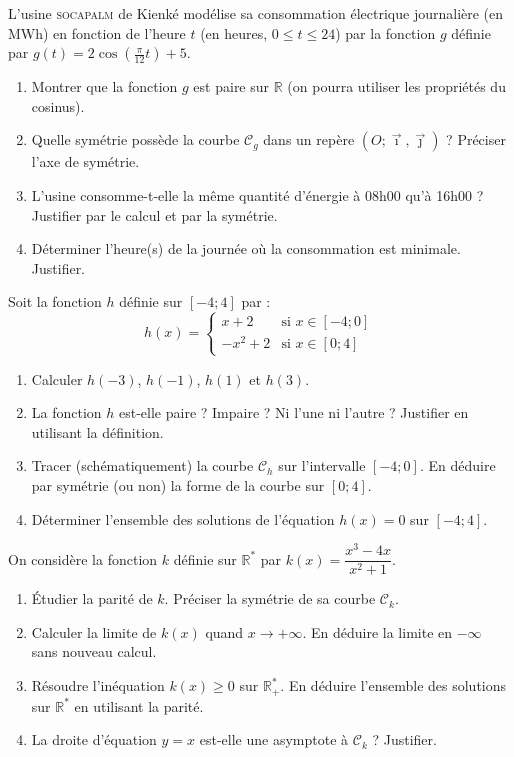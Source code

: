 \documentclass[11pt]{article}
\begin{document}
\begin{exercice}
\label{exo:usine}
L'usine \textsc{socapalm} de Kienké modélise sa consommation électrique journalière (en MWh) en fonction de l'heure $t$ (en heures, $0 \le t \le 24$) par la fonction $g$ définie par $g(t) = 2\cos\left(\frac{\pi}{12}t\right) + 5$.
\begin{enumerate}
    \item Montrer que la fonction $g$ est paire sur $\mathbb{R}$ (on pourra utiliser les propriétés du cosinus).
    \item Quelle symétrie possède la courbe $\mathcal{C}_g$ dans un repère $(O; \vec{\imath}, \vec{\jmath})$ ? Préciser l'axe de symétrie.
    \item L'usine consomme-t-elle la même quantité d'énergie à 08h00 qu'à 16h00 ? Justifier par le calcul et par la symétrie.
    \item Déterminer l'heure(s) de la journée où la consommation est minimale. Justifier.
\end{enumerate}
\end{exercice}

\begin{exercice}
\label{exo:construction}
Soit la fonction $h$ définie sur $[-4; 4]$ par :
\[
h(x) = \begin{cases}
x + 2 & \text{si } x \in [-4; 0] \\
-x^2 + 2 & \text{si } x \in [0; 4]
\end{cases}
\]
\begin{enumerate}
    \item Calculer $h(-3)$, $h(-1)$, $h(1)$ et $h(3)$.
    \item La fonction $h$ est-elle paire ? Impaire ? Ni l'une ni l'autre ? Justifier en utilisant la définition.
    \item Tracer (schématiquement) la courbe $\mathcal{C}_h$ sur l'intervalle $[-4; 0]$. En déduire par symétrie (ou non) la forme de la courbe sur $[0; 4]$.
    \item Déterminer l'ensemble des solutions de l'équation $h(x) = 0$ sur $[-4; 4]$.
\end{enumerate}
\end{exercice}

\begin{exercice}
\label{exo:rationnelle}
On considère la fonction $k$ définie sur $\mathbb{R}^*$ par $k(x) = \dfrac{x^3 - 4x}{x^2 + 1}$.
\begin{enumerate}
    \item Étudier la parité de $k$. Préciser la symétrie de sa courbe $\mathcal{C}_k$.
    \item Calculer la limite de $k(x)$ quand $x \to +\infty$. En déduire la limite en $-\infty$ sans nouveau calcul.
    \item Résoudre l'inéquation $k(x) \ge 0$ sur $\mathbb{R}^*_+$. En déduire l'ensemble des solutions sur $\mathbb{R}^*$ en utilisant la parité.
    \item La droite d'équation $y = x$ est-elle une asymptote à $\mathcal{C}_k$ ? Justifier.
\end{enumerate}
\end{exercice}
\end{document}
